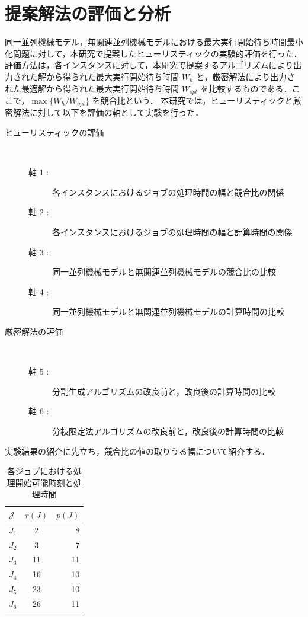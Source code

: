 \documentclass[12pt]{optlab-bachelor}
\begin{document}
\section{提案解法の評価と分析}\label{5_s_3}
同一並列機械モデル，無関連並列機械モデルにおける最大実行開始待ち時間最小化問題に対して，本研究で提案したヒューリスティックの実験的評価を行った．評価方法は，各インスタンスに対して，本研究で提案するアルゴリズムにより出力された解から得られた最大実行開始待ち時間 $W_h$ と，厳密解法により出力された最適解から得られた最大実行開始待ち時間 $W_{opt}$ を比較するものである．ここで，$\max\{W_h/W_{opt}\}$ を競合比という．
本研究では，ヒューリスティックと厳密解法に対して以下を評価の軸として実験を行った．

\begin{description}
  \item[ヒューリスティックの評価] ~
  \begin{description}
    \item[軸 1 :] 各インスタンスにおけるジョブの処理時間の幅と競合比の関係
    \item[軸 2 :] 各インスタンスにおけるジョブの処理時間の幅と計算時間の関係
    \item[軸 3 :] 同一並列機械モデルと無関連並列機械モデルの競合比の比較
    \item[軸 4 :] 同一並列機械モデルと無関連並列機械モデルの計算時間の比較
  \end{description}
  \item[厳密解法の評価] ~
  \begin{description}
    \item[軸 5 :] 分割生成アルゴリズムの改良前と，改良後の計算時間の比較
    \item[軸 6 :] 分枝限定法アルゴリズムの改良前と，改良後の計算時間の比較
  \end{description}
\end{description}

実験結果の紹介に先立ち，競合比の値の取りうる幅について紹介する．
\begin{table}[htb]
  \begin{center}
    \begin{tabular}{|l|c|r|} \hline
      $\mathcal{J}$ & $r(J)$ & $p(J)$ \\ \hline \hline
      $J_1$ & 2 & 8 \\ \hline
      $J_2$ & 3 & 7 \\ \hline
      $J_3$ & 11 & 11 \\ \hline
      $J_4$ & 16 & 10 \\ \hline
      $J_5$ & 23 & 10 \\ \hline
      $J_6$ & 26 & 11 \\ \hline
    \end{tabular}
    \caption{各ジョブにおける処理開始可能時刻と処理時間}
  \end{center}
\end{table}
\end{document}
